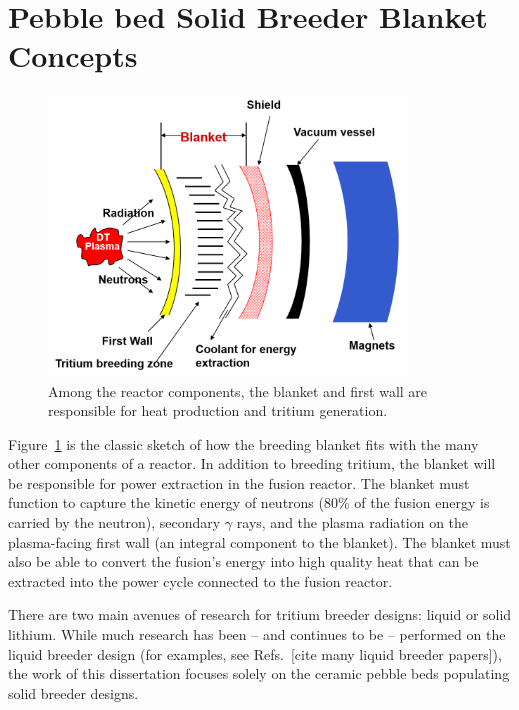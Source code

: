 \section{Pebble bed Solid Breeder Blanket Concepts}\label{sec:blanket-design}

\begin{figure}
	\centering
	\includegraphics[width=0.85\textwidth]{chapters/figures/reactor_components.png} 
	\caption{Among the reactor components, the blanket and first wall are responsible for heat production and tritium generation.}
	\label{fig:reactor-components}
\end{figure}

Figure~\ref{fig:reactor-components} is the classic sketch of how the breeding blanket fits with the many other components of a reactor. In addition to breeding tritium, the blanket will be responsible for power extraction in the fusion reactor. The blanket must function to capture the kinetic energy of neutrons (80\% of the fusion energy is carried by the neutron), secondary $\gamma$ rays, and the plasma radiation on the plasma-facing first wall (an integral component to the blanket). The blanket must also be able to convert the fusion's energy into high quality heat that can be extracted into the power cycle connected to the fusion reactor. 

There are two main avenues of research for tritium breeder designs: liquid or solid lithium. While much research has been -- and continues to be -- performed on the liquid breeder design (for examples, see Refs.~[cite many liquid breeder papers]), the work of this dissertation focuses solely on the ceramic pebble beds populating solid breeder designs.

